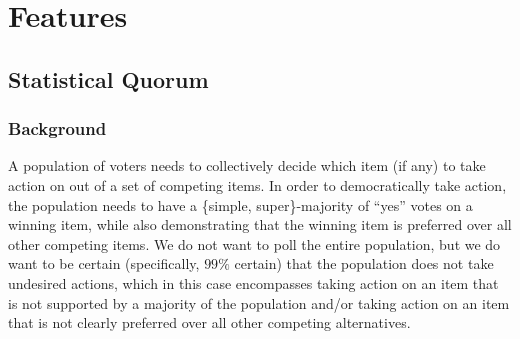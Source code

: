 \documentclass{sigchi}
\begin{document}
%
%
%
%
%

\section{Features}

\subsection{Statistical Quorum}

\subsubsection{Background}
A population of voters needs to collectively decide which item (if any) to take action on out of a set of competing items.
In order to democratically take action, the population needs to have a \{simple, super\}-majority of ``yes'' votes on a
winning item, while also demonstrating that the winning item is preferred over all other competing items.
We do not want to poll the entire population, but we do want to be certain (specifically, $99\%$ certain) that
the population does not take undesired actions, which in this case encompasses taking action on an item that is not
supported by a majority of the population and/or taking action on an item that is not clearly preferred over all
other competing alternatives.
\end{document}
